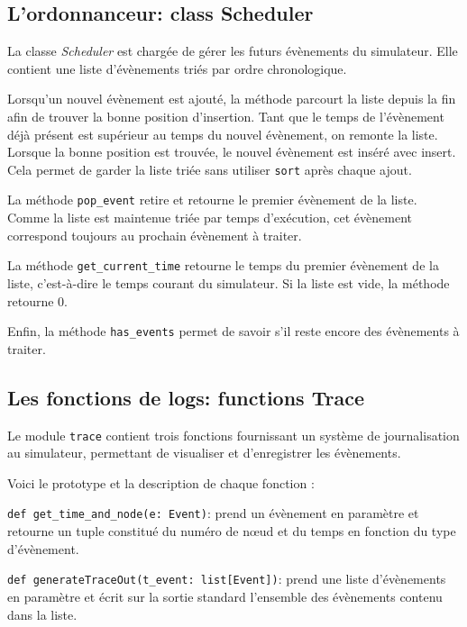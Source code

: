 \documentclass[11pt,a4paper]{article}
\begin{document}
\bigskip

\subsection{L'ordonnanceur: class Scheduler}

La classe \emph{Scheduler} est chargée de gérer les futurs évènements du simulateur. Elle contient une liste d'évènements triés par ordre chronologique.

Lorsqu'un nouvel évènement est ajouté, la méthode parcourt la liste depuis la fin afin de trouver la bonne position d'insertion. Tant que le temps de l'évènement déjà présent est supérieur au temps du nouvel évènement, on remonte la liste. Lorsque la bonne position est trouvée, le nouvel évènement est inséré avec insert. Cela permet de garder la liste triée sans utiliser \lstinline|sort| après chaque ajout.

La méthode \lstinline|pop_event| retire et retourne le premier évènement de la liste. Comme la liste est maintenue triée par temps d'exécution, cet évènement correspond toujours au prochain évènement à traiter.

La méthode \lstinline|get_current_time| retourne le temps du premier évènement de la liste, c'est-à-dire le temps courant du simulateur. Si la liste est vide, la méthode retourne 0.

Enfin, la méthode \lstinline|has_events| permet de savoir s'il reste encore des évènements à traiter.

\bigskip

\subsection{Les fonctions de logs: functions Trace}

Le module \lstinline|trace| contient trois fonctions fournissant un système de journalisation au simulateur, permettant de visualiser et d'enregistrer les évènements.

Voici le prototype et la description de chaque fonction :

\lstinline|def get_time_and_node(e: Event)|:  prend un évènement en paramètre et retourne un tuple constitué du numéro de nœud et du temps en fonction du type d'évènement.

\lstinline|def generateTraceOut(t_event: list[Event])|:  prend une liste d'évènements en paramètre et écrit sur la sortie standard l'ensemble des évènements contenu dans la liste.
\end{document}
